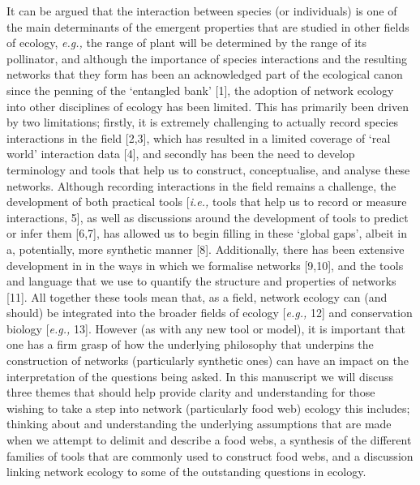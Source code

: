 \documentclass[
]{article}
\begin{document}
It can be argued that the interaction between species (or individuals)
is one of the main determinants of the emergent properties that are
studied in other fields of ecology, \emph{e.g.,} the range of plant will
be determined by the range of its pollinator, and although the
importance of species interactions and the resulting networks that they
form has been an acknowledged part of the ecological canon since the
penning of the `entangled bank' {[}1{]}, the adoption of network ecology
into other disciplines of ecology has been limited. This has primarily
been driven by two limitations; firstly, it is extremely challenging to
actually record species interactions in the field {[}2,3{]}, which has
resulted in a limited coverage of `real world' interaction data {[}4{]},
and secondly has been the need to develop terminology and tools that
help us to construct, conceptualise, and analyse these networks.
Although recording interactions in the field remains a challenge, the
development of both practical tools {[}\emph{i.e.,} tools that help us
to record or measure interactions, 5{]}, as well as discussions around
the development of tools to predict or infer them {[}6,7{]}, has allowed
us to begin filling in these `global gaps', albeit in a, potentially,
more synthetic manner {[}8{]}. Additionally, there has been extensive
development in in the ways in which we formalise networks {[}9,10{]},
and the tools and language that we use to quantify the structure and
properties of networks {[}11{]}. All together these tools mean that, as
a field, network ecology can (and should) be integrated into the broader
fields of ecology {[}\emph{e.g.,} 12{]} and conservation biology
{[}\emph{e.g.,} 13{]}. However (as with any new tool or model), it is
important that one has a firm grasp of how the underlying philosophy
that underpins the construction of networks (particularly synthetic
ones) can have an impact on the interpretation of the questions being
asked. In this manuscript we will discuss three themes that should help
provide clarity and understanding for those wishing to take a step into
network (particularly food web) ecology this includes; thinking about
and understanding the underlying assumptions that are made when we
attempt to delimit and describe a food webs, a synthesis of the
different families of tools that are commonly used to construct food
webs, and a discussion linking network ecology to some of the
outstanding questions in ecology.
\end{document}
